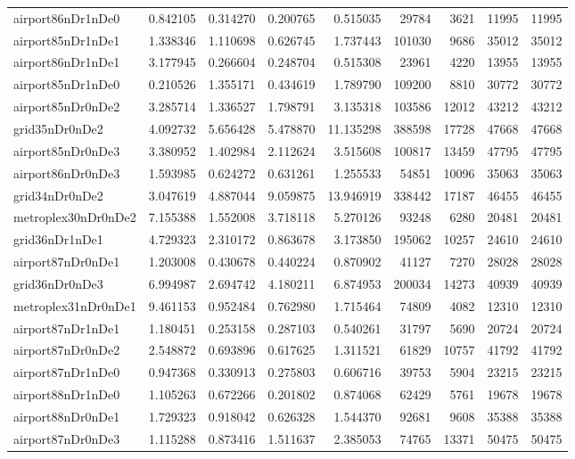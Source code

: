 \begin{longtable}{|l|r|r|r|r|r|r|r|r|}
airport86nDr1nDe0 & 0.842105 & 0.314270 & 0.200765 & 0.515035 & 29784 & 3621 & 11995 & 11995 \\
airport85nDr1nDe1 & 1.338346 & 1.110698 & 0.626745 & 1.737443 & 101030 & 9686 & 35012 & 35012 \\
airport86nDr1nDe1 & 3.177945 & 0.266604 & 0.248704 & 0.515308 & 23961 & 4220 & 13955 & 13955 \\
airport85nDr1nDe0 & 0.210526 & 1.355171 & 0.434619 & 1.789790 & 109200 & 8810 & 30772 & 30772 \\
airport85nDr0nDe2 & 3.285714 & 1.336527 & 1.798791 & 3.135318 & 103586 & 12012 & 43212 & 43212 \\
grid35nDr0nDe2 & 4.092732 & 5.656428 & 5.478870 & 11.135298 & 388598 & 17728 & 47668 & 47668 \\
airport85nDr0nDe3 & 3.380952 & 1.402984 & 2.112624 & 3.515608 & 100817 & 13459 & 47795 & 47795 \\
airport86nDr0nDe3 & 1.593985 & 0.624272 & 0.631261 & 1.255533 & 54851 & 10096 & 35063 & 35063 \\
grid34nDr0nDe2 & 3.047619 & 4.887044 & 9.059875 & 13.946919 & 338442 & 17187 & 46455 & 46455 \\
metroplex30nDr0nDe2 & 7.155388 & 1.552008 & 3.718118 & 5.270126 & 93248 & 6280 & 20481 & 20481 \\
grid36nDr1nDe1 & 4.729323 & 2.310172 & 0.863678 & 3.173850 & 195062 & 10257 & 24610 & 24610 \\
airport87nDr0nDe1 & 1.203008 & 0.430678 & 0.440224 & 0.870902 & 41127 & 7270 & 28028 & 28028 \\
grid36nDr0nDe3 & 6.994987 & 2.694742 & 4.180211 & 6.874953 & 200034 & 14273 & 40939 & 40939 \\
metroplex31nDr0nDe1 & 9.461153 & 0.952484 & 0.762980 & 1.715464 & 74809 & 4082 & 12310 & 12310 \\
airport87nDr1nDe1 & 1.180451 & 0.253158 & 0.287103 & 0.540261 & 31797 & 5690 & 20724 & 20724 \\
airport87nDr0nDe2 & 2.548872 & 0.693896 & 0.617625 & 1.311521 & 61829 & 10757 & 41792 & 41792 \\
airport87nDr1nDe0 & 0.947368 & 0.330913 & 0.275803 & 0.606716 & 39753 & 5904 & 23215 & 23215 \\
airport88nDr1nDe0 & 1.105263 & 0.672266 & 0.201802 & 0.874068 & 62429 & 5761 & 19678 & 19678 \\
airport88nDr0nDe1 & 1.729323 & 0.918042 & 0.626328 & 1.544370 & 92681 & 9608 & 35388 & 35388 \\
airport87nDr0nDe3 & 1.115288 & 0.873416 & 1.511637 & 2.385053 & 74765 & 13371 & 50475 & 50475 \\

\end{longtable}
